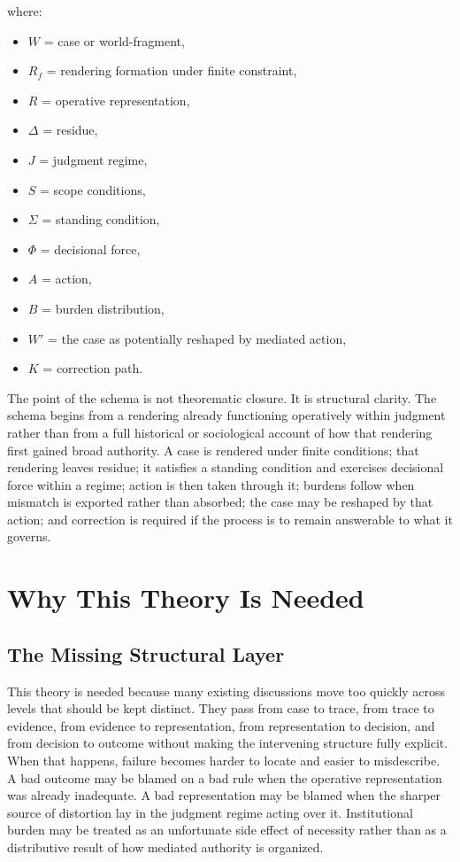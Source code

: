 \documentclass[11pt]{article}
\begin{document}
where:
\begin{itemize}
    \item $W$ = case or world-fragment,
    \item $R_f$ = rendering formation under finite constraint,
    \item $R$ = operative representation,
    \item $\Delta$ = residue,
    \item $J$ = judgment regime,
    \item $S$ = scope conditions,
    \item $\Sigma$ = standing condition,
    \item $\Phi$ = decisional force,
    \item $A$ = action,
    \item $B$ = burden distribution,
    \item $W'$ = the case as potentially reshaped by mediated action,
    \item $K$ = correction path.
\end{itemize}

The point of the schema is not theorematic closure. It is structural clarity. The schema begins from a rendering already functioning operatively within judgment rather than from a full historical or sociological account of how that rendering first gained broad authority. A case is rendered under finite conditions; that rendering leaves residue; it satisfies a standing condition and exercises decisional force within a regime; action is then taken through it; burdens follow when mismatch is exported rather than absorbed; the case may be reshaped by that action; and correction is required if the process is to remain answerable to what it governs.
\section{Why This Theory Is Needed}

\subsection{The Missing Structural Layer}

This theory is needed because many existing discussions move too quickly across levels that should be kept distinct. They pass from case to trace, from trace to evidence, from evidence to representation, from representation to decision, and from decision to outcome without making the intervening structure fully explicit. When that happens, failure becomes harder to locate and easier to misdescribe. A bad outcome may be blamed on a bad rule when the operative representation was already inadequate. A bad representation may be blamed when the sharper source of distortion lay in the judgment regime acting over it. Institutional burden may be treated as an unfortunate side effect of necessity rather than as a distributive result of how mediated authority is organized.
\end{document}
